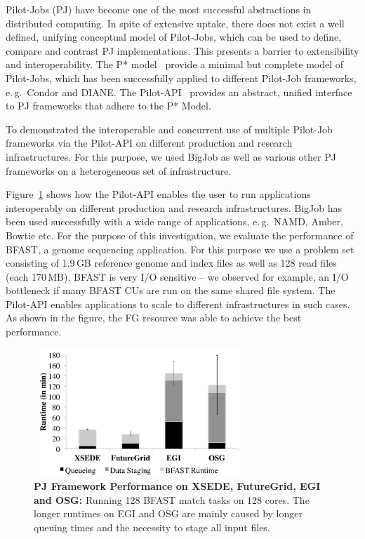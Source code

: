 \documentclass[]{paper}
\begin{document}
Pilot-Jobs (PJ) have become one of the most successful abstractions in
distributed computing. In spite of extensive uptake, there does not exist a well
defined, unifying conceptual model of Pilot-Jobs, which can be used to define,
compare and contrast PJ implementations. This presents a barrier to
extensibility and interoperability. The P* model~\cite{pstar-2012,pstar-sc-2012}
provide a minimal but complete model of Pilot-Jobs, which has been successfully
applied to different Pilot-Job frameworks, e.\,g.\ Condor and DIANE. The
Pilot-API~\cite{pilot_api} provides an abstract, unified interface to PJ
frameworks that adhere to the P* Model.


To demonstrated the interoperable and concurrent use of multiple Pilot-Job
frameworks via the Pilot-API on different production and research
infrastructures. For this purpose, we used BigJob as well as various other PJ 
frameworks on a heterogeneous set of infrastructure. 

Figure~\ref{fig:perf_perf-bfast-bj} shows how the Pilot-API enables the user to
run applications interoperably on different production and research
infrastructures. BigJob has been used successfully with a wide range of
applications, e.\,g.\ NAMD, Amber, Bowtie etc. For the purpose of this
investigation, we evaluate the performance of BFAST, a genome sequencing
application. For this purpose we use a problem set consisting of 
1.9\,GB reference genome and index files as well as 128 read
files (each 170\,MB). BFAST is very I/O sensitive -- we observed for example, an
I/O bottleneck if many BFAST CUs are run on the same shared file system. The
Pilot-API enables applications to scale to different infrastructures in such
cases. As shown in the figure, the FG resource was able to achieve the best 
performance.


\begin{figure}[t]
\centering
\includegraphics[width=0.7\textwidth]{figures/128-bfast-egi-fg-xsede-osg.pdf}
\caption{\textbf{PJ Framework Performance on XSEDE, FutureGrid, EGI and 
  OSG:} Running 128 BFAST match tasks on 128 cores. The longer runtimes on EGI 
  and OSG are mainly caused by  longer queuing times and the necessity to      
  stage all input files.}
  \label{fig:perf_perf-bfast-bj}
\end{figure}
\end{document}
